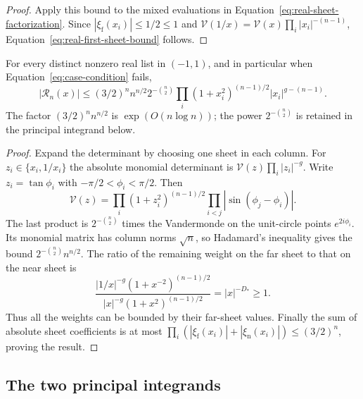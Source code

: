 \begin{proof}
Apply this bound to the mixed evaluations in
Equation~\eqref{eq:real-sheet-factorization}. Since
$|\xi_{\mathrm f}(x_i)|\le1/2\le1$ and
$\mathcal V(1/x)=\mathcal V(x)\prod_i|x_i|^{-(n-1)}$,
Equation~\eqref{eq:real-first-sheet-bound} follows.
\end{proof}

\begin{proposition}\label{prop:second-sheet-bound}
For every distinct nonzero real list in $(-1,1)$, and in particular
when Equation~\eqref{eq:case-condition} fails,
\begin{equation}\label{eq:real-second-sheet-bound}
 |\mathcal R_n(x)|\le
 (3/2)^n n^{n/2}2^{-\binom n2}
 \prod_i(1+x_i^2)^{(n-1)/2}|x_i|^{g-(n-1)}.
\end{equation}
The factor $(3/2)^n n^{n/2}$ is $\exp(O(n\log n))$; the power
$2^{-\binom n2}$ is retained in the principal integrand below.
\end{proposition}

\begin{proof}
Expand the determinant by choosing one sheet in each column.  For
$z_i\in\{x_i,1/x_i\}$ the absolute monomial determinant is
$\mathcal V(z)\prod_i|z_i|^{-g}$.  Write
$z_i=\tan\phi_i$ with $-\pi/2<\phi_i<\pi/2$.  Then
\[
 \mathcal V(z)=\prod_i(1+z_i^2)^{(n-1)/2}
              \prod_{i<j}|\sin(\phi_j-\phi_i)|.
\]
The last product is $2^{-\binom n2}$ times the Vandermonde on
the unit-circle points $e^{2i\phi_i}$.  Its monomial matrix has
column norms $\sqrt n$, so Hadamard's inequality gives the bound
$2^{-\binom n2}n^{n/2}$.  The ratio of the remaining weight on
the far sheet to that on the near sheet is
\[
 \frac{|1/x|^{-g}(1+x^{-2})^{(n-1)/2}}
      {|x|^{-g}(1+x^2)^{(n-1)/2}}
 =|x|^{-D_*}\ge1.
\]
Thus all the weights can be bounded by their far-sheet values.
Finally the sum of absolute sheet coefficients is at most
$\prod_i(|\xi_{\mathrm f}(x_i)|+|\xi_{\mathrm n}(x_i)|)
\le(3/2)^n$, proving the result.
\end{proof}

\subsection{The two principal integrands}

